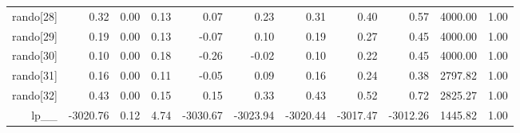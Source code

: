 \begin{table}[ht]
\begin{tabular}{rrrrrrrrrrr}
  rando[28] & 0.32 & 0.00 & 0.13 & 0.07 & 0.23 & 0.31 & 0.40 & 0.57 & 4000.00 & 1.00 \\ 
  rando[29] & 0.19 & 0.00 & 0.13 & -0.07 & 0.10 & 0.19 & 0.27 & 0.45 & 4000.00 & 1.00 \\ 
  rando[30] & 0.10 & 0.00 & 0.18 & -0.26 & -0.02 & 0.10 & 0.22 & 0.45 & 4000.00 & 1.00 \\ 
  rando[31] & 0.16 & 0.00 & 0.11 & -0.05 & 0.09 & 0.16 & 0.24 & 0.38 & 2797.82 & 1.00 \\ 
  rando[32] & 0.43 & 0.00 & 0.15 & 0.15 & 0.33 & 0.43 & 0.52 & 0.72 & 2825.27 & 1.00 \\ 
  lp\_\_ & -3020.76 & 0.12 & 4.74 & -3030.67 & -3023.94 & -3020.44 & -3017.47 & -3012.26 & 1445.82 & 1.00 \\ 
   \hline
\end{tabular}
\label{scalefit_tab}
\end{table}
